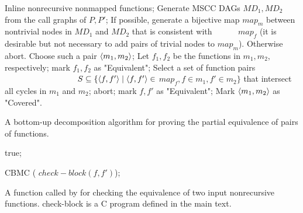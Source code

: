 \begin{algorithm}
\begin{algorithmic}[1]
\State \label{step:inline} Inline nonrecursive nonmapped functions;
\State \label{step:generate} Generate MSCC DAGs $MD_1, MD_2$
          from the call graphs of $P,P'$;
\State If possible,\label{step:possible} generate a bijective map $map_m$ between nontrivial nodes in $MD_1$ and $MD_2$ that is consistent with 
\mbox{~~~~~} $map_f$ (it is desirable but not necessary to add pairs of trivial nodes to $map_m$). Otherwise abort.
 \label{step:while}
  \State \label{step:choose} Choose such a pair $\langle m_1,m_2\rangle$;
   \label{step:m1}
    \State Let $f_1,f_2$ be the functions in $m_1,m_2$, respectively;
     \label{step:Check}
          {mark $f_1,f_2$ as "Equivalent"; }
    \EndIf \label{step:m1endIf}
    \Else
      \State \label{step:select}Select a set of function pairs \newline \mbox{~~~~~~~~~~~~~~~~~} $S \subseteq \{\langle f,f'\rangle\mid \langle f,f'\rangle \in$ $map_f, f \in m_1, f' \in m_2\}$ that intersect all cycles in $m_1$ and $m_2$;
      \label{step:forall}
        \label{step:abort}{abort;} 
        \EndIf
      \EndFor
       \label{step:forall2}
         mark $f,f'$ as "Equivalent";
      \EndFor
  \EndIf \label{step:selectEnd}
\State \label{step:mark} Mark $\langle m_1,m_2\rangle$ as "Covered".
\EndWhile
\EndFunction
\end{algorithmic}
\caption{A bottom-up decomposition algorithm for proving the partial equivalence of pairs of functions.}
\label{alg:OriginalProve}
\end{algorithm}


\begin{algorithm}
\begin{algorithmic}[1]


 true;

\EndIf

 CBMC ( $check-block (f,f')$);

\EndFunction
\end{algorithmic}
\caption{A function called by  for checking the equivalence of two
input nonrecursive functions. check-block is a C program defined in the main text.}
\label{alg:Check}
\end{algorithm}

